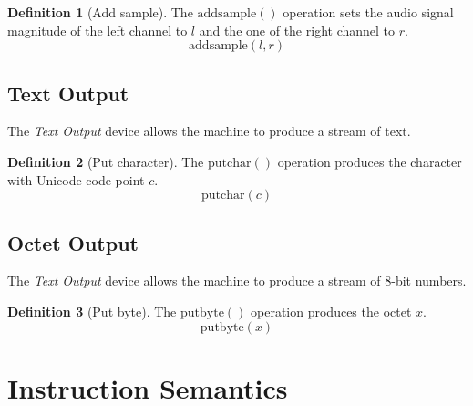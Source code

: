 \documentclass[a4paper,10pt]{article}
\newcommand{\PutByte}[1]{\mathrm{putbyte}(#1)}
\newcommand{\PutChar}[1]{\mathrm{putchar}(#1)}
\newcommand{\AddSample}[1]{\mathrm{addsample}(#1)}
\theoremstyle{definition}
\newtheorem{definition}{Definition}
\begin{document}
\begin{definition}[Add sample]
  The $\AddSample{}$ operation sets the audio signal magnitude of the left channel to $l$ and the one of the right channel to $r$.
\[ \AddSample{l, r} \]
\end{definition}

\subsection{Text Output}
\label{sec:text-output}

The \emph{Text Output} device allows the machine to produce a stream of text.

\begin{definition}[Put character]
  The $\PutChar{}$ operation produces the character with Unicode code point $c$.
  \[ \PutChar{c} \]
\end{definition}

\subsection{Octet Output}
\label{sec:octet-output}

The \emph{Text Output} device allows the machine to produce a stream of 8-bit numbers.

\begin{definition}[Put byte]
  The $\PutByte{}$ operation produces the octet $x$.
  \[ \PutByte{x} \]
\end{definition}


\section{Instruction Semantics}
\label{sec:instruction-semantics}
\end{document}
